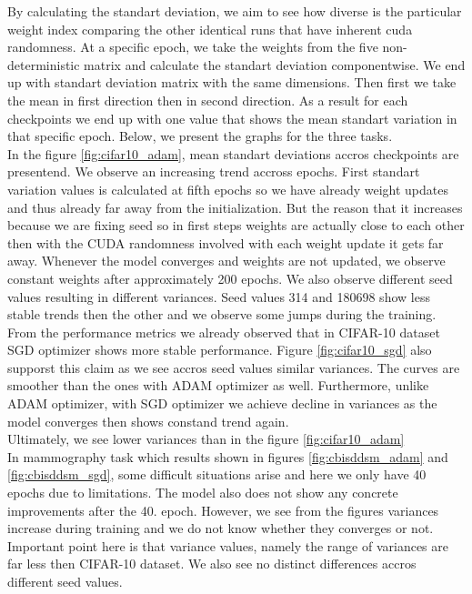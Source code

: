 \clearpage    
By calculating the standart deviation, we aim to see how diverse is the particular weight index comparing the other identical runs that have inherent cuda randomness.
At a specific epoch, we take the weights from the five non-deterministic matrix and calculate the standart deviation componentwise. We end up with standart deviation matrix with the same dimensions.
Then first we take the mean in first direction then in second direction. As a result for each checkpoints we end up with one value that shows the mean standart variation in that specific epoch.
Below, we present the graphs for the three tasks.\\

In the figure \ref{fig:cifar10_adam}, mean standart deviations accros checkpoints are presentend. We observe
an increasing trend accross epochs. First standart variation values is calculated at fifth epochs so we have already weight updates and thus already far away from the initialization. But the reason that
it increases because we are fixing seed so in first steps weights are actually close to each other then with the CUDA randomness involved with each weight update it gets far away. Whenever the model converges and weights are not updated, we observe constant weights after approximately 200 epochs.
We also observe different seed values resulting in different variances. Seed values 314 and 180698 show less stable trends then the other and we observe some jumps during the training.\\

From the performance metrics we already observed that in CIFAR-10 dataset SGD optimizer shows more stable performance. Figure \ref{fig:cifar10_sgd} also supporst this claim as we see accros seed values similar variances. 
The curves are smoother than the ones with ADAM optimizer as well. Furthermore, unlike ADAM optimizer, with SGD optimizer we achieve decline in variances as the model converges then shows constand trend again.\\
Ultimately, we see lower variances than in the figure \ref{fig:cifar10_adam}\\

In mammography task which results shown in figures \ref{fig:cbisddsm_adam} and \ref{fig:cbisddsm_sgd}, some difficult situations arise and here we only have 40 epochs due to limitations. The model also does not show any concrete improvements after the 40. epoch. However, we see from the figures variances increase during training and we do not know whether they converges or not.
Important point here is that variance values, namely the range of variances are far less then CIFAR-10 dataset. We also see no distinct differences accros different seed values.\\

